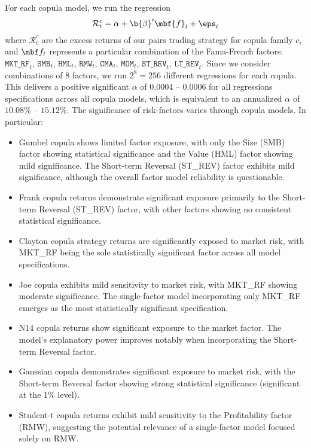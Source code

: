 For each copula model, we run the  regression
$$
\mathcal{R}_{t}^{c} = \alpha + \b{\beta}' \mbf{f}_t + \eps_t
$$
where 
$\mathcal{R}_{t}^{c}$ are the excess returns of our pairs trading strategy for copula family $c$, and 
$\mbf f_t$ represents a particular combination of the Fama-French factors: 
$\texttt{MKT\_RF}_t$, $\texttt{SMB}_t$, $\texttt{HML}_t$, $\texttt{RMW}_t$, $\texttt{CMA}_t$, $\texttt{MOM}_t$, $\texttt{ST\_REV}_t$, $\texttt{LT\_REV}_t$.
Since we consider combinations of 8 factors, we run $2^8=256$ different regressions for each copula. This delivers a positive significant $\alpha$ of  $0.0004$ -- $0.0006$ for all regressions specifications across all copula models, which is equivalent to an annualized $\alpha$ of $10.08\%$ -- $15.12\%$. The significance of risk-factors varies through copula models. In particular: 
\begin{itemize}[leftmargin=*,noitemsep]
  \item Gumbel copula shows limited factor exposure, with only the Size (SMB) factor showing statistical significance and the Value (HML) factor showing mild significance. The Short-term Reversal (ST\_REV) factor exhibits mild significance, although the overall factor model reliability is questionable.
  
  \item Frank copula returns demonstrate significant exposure primarily to the Short-term Reversal (ST\_REV) factor, with other factors showing no consistent statistical significance.
  
  \item Clayton copula strategy returns are significantly exposed to market risk, with MKT\_RF being the sole statistically significant factor across all model specifications.
  
  \item Joe copula exhibits mild sensitivity to market risk, with MKT\_RF showing moderate significance. The single-factor model incorporating only MKT\_RF emerges as the most statistically significant specification.
  
  \item N14 copula returns show significant exposure to the market factor. The model's explanatory power improves notably when incorporating the Short-term Reversal factor.
  
  \item Gaussian copula demonstrates significant exposure to market risk, with the Short-term Reversal factor showing strong statistical significance (significant at the 1\% level). 
  
  \item Student-t copula returns exhibit mild sensitivity to the Profitability factor (RMW), suggesting the potential relevance of a single-factor model focused solely on RMW.
\end{itemize}
